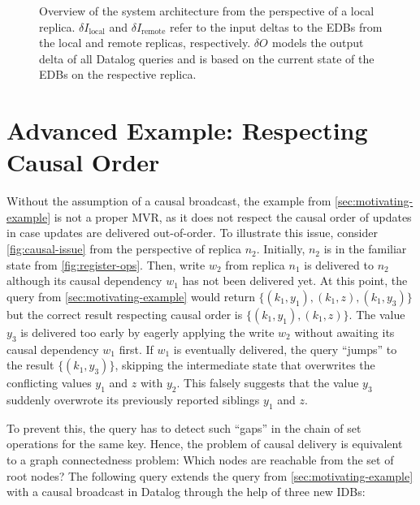 \documentclass{article}
\newcommand{\deltaI}[1]{\(\delta I_{\text{#1}}\)}
\newcommand{\deltaO}[1][]{\(\delta O_{\text{#1}}\)}
\begin{document}
\begin{figure*}

    \caption{
        Overview of the system architecture from the perspective of a local
        replica.
        \deltaI{local} and \deltaI{remote} refer to the input deltas to
        the EDBs from the local and remote replicas, respectively.
        \deltaO{} models the output delta of all Datalog queries and is based on
        the current state of the EDBs on the respective replica.
    }
    \label{fig:system-overview}
\end{figure*}

\section{Advanced Example: Respecting Causal Order}
\label{sec:advanced-example}

Without the assumption of a causal broadcast,
the example from \autoref{sec:motivating-example} is not a proper MVR,
as it does not respect the causal order of updates in case updates are delivered
out-of-order.
To illustrate this issue, consider \autoref{fig:causal-issue} from the
perspective of replica \(n_2\).
Initially, \(n_2\) is in the familiar state from \autoref{fig:register-ops}.
Then, write \(w_2\) from replica \(n_1\) is delivered to \(n_2\) although its
causal dependency \(w_1\) has not been delivered yet.
At this point, the query from \autoref{sec:motivating-example} would return
\(\{ (k_1, y_1), (k_1, z), (k_1, y_3)\} \)
but the correct result respecting causal order is
\(\{ (k_1, y_1), (k_1, z) \}\).
The value \(y_3\) is delivered too early by eagerly applying the write \(w_2\)
without awaiting its causal dependency \(w_1\) first.
If \(w_1\) is eventually delivered, the query ``jumps'' to the result
\( \{ (k_1, y_3) \} \), skipping the intermediate state
that overwrites the conflicting values \(y_1\) and \(z\) with \(y_2\).
This falsely suggests that the value \(y_3\) suddenly overwrote its previously
reported siblings \(y_1\) and \(z\).

To prevent this, the query has to detect such ``gaps'' in the chain of set
operations for the same key.
Hence, the problem of causal delivery is equivalent to a graph connectedness
problem: Which nodes are reachable from the set of root nodes?
The following query extends the query from \autoref{sec:motivating-example}
with a causal broadcast in Datalog through the help of three new IDBs:
\end{document}
